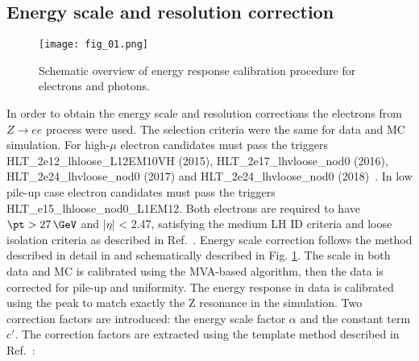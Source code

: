     \subsection{Energy scale and resolution correction}
        \begin{figure}[H]
    	\centering
    	\texttt{[image: fig\_01.png]}
    	\caption{Schematic overview of energy response calibration procedure for electrons and photons.}
    	\label{fig:calibrationChain}
    \end{figure}
    In order to obtain the energy scale and resolution corrections the electrons from $Z\rightarrow ee$ process were used. The selection criteria were the same for data and MC simulation. For high-$\mu$ electron candidates must pass the triggers HLT\_2e12\_lhloose\_L12EM10VH (2015), HLT\_2e17\_lhvloose\_nod0 (2016), HLT\_2e24\_lhvloose\_nod0 (2017) and HLT\_2e24\_lhvloose\_nod0 (2018)~\cite{Aaboud:2018ugz}. In low pile-up case electron candidates must pass the triggers HLT\_e15\_lhloose\_nod0\_L1EM12. Both electrons are required to have $\pt > 27\,\GeV$ and |$\eta$| < 2.47, satisfying the medium LH ID criteria and loose isolation criteria as described in Ref.~\cite{PERF-2017-03}. 
    Energy scale correction follows the method described in detail in \cite{egamma_perf_2017} and schematically described in Fig. \ref{fig:calibrationChain}. The scale in both data and MC is calibrated using the MVA-based algorithm, then the data is corrected for pile-up and uniformity. The energy response in data is calibrated using the \Zee peak to match exactly the Z resonance in the simulation. Two correction factors are introduced: the energy scale factor $\alpha$ and the constant term $c'$. The correction factors are extracted using the template method described in Ref.~\cite{PERF-2013-05}:
